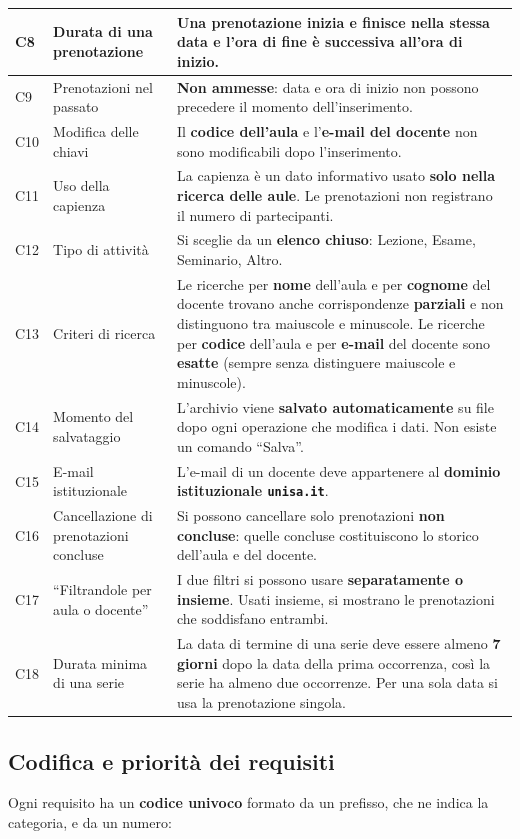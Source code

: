 \begin{longtable}{|l|P{3.0cm}|P{7.2cm}|}
C8 & Durata di una prenotazione & Una prenotazione \textbf{inizia e finisce nella stessa data} e l'ora di fine è successiva all'ora di inizio. \\ \hline
C9 & Prenotazioni nel passato & \textbf{Non ammesse}: data e ora di inizio non possono precedere il momento dell'inserimento. \\ \hline
C10 & Modifica delle chiavi & Il \textbf{codice dell'aula} e l'\textbf{e-mail del docente} non sono modificabili dopo l'inserimento. \\ \hline
C11 & Uso della capienza & La capienza è un dato informativo usato \textbf{solo nella ricerca delle aule}. Le prenotazioni non registrano il numero di partecipanti. \\ \hline
C12 & Tipo di attività & Si sceglie da un \textbf{elenco chiuso}: Lezione, Esame, Seminario, Altro. \\ \hline
C13 & Criteri di ricerca & Le ricerche per \textbf{nome} dell'aula e per \textbf{cognome} del docente trovano anche corrispondenze \textbf{parziali} e non distinguono tra maiuscole e minuscole. Le ricerche per \textbf{codice} dell'aula e per \textbf{e-mail} del docente sono \textbf{esatte} (sempre senza distinguere maiuscole e minuscole). \\ \hline
C14 & Momento del salvataggio & L'archivio viene \textbf{salvato automaticamente} su file dopo ogni operazione che modifica i dati. Non esiste un comando ``Salva''. \\ \hline
C15 & E-mail istituzionale & L'e-mail di un docente deve appartenere al \textbf{dominio istituzionale \texttt{unisa.it}}. \\ \hline
C16 & Cancellazione di prenotazioni concluse & Si possono cancellare solo prenotazioni \textbf{non concluse}: quelle concluse costituiscono lo storico dell'aula e del docente. \\ \hline
C17 & ``Filtrandole per aula o docente'' & I due filtri si possono usare \textbf{separatamente o insieme}. Usati insieme, si mostrano le prenotazioni che soddisfano entrambi. \\ \hline
C18 & Durata minima di una serie & La data di termine di una serie deve essere almeno \textbf{7 giorni} dopo la data della prima occorrenza, così la serie ha almeno due occorrenze. Per una sola data si usa la prenotazione singola. \\ \hline
\end{longtable}

\subsection{Codifica e priorità dei requisiti}
Ogni requisito ha un \textbf{codice univoco} formato da un prefisso, che ne indica la categoria, e da un numero:

